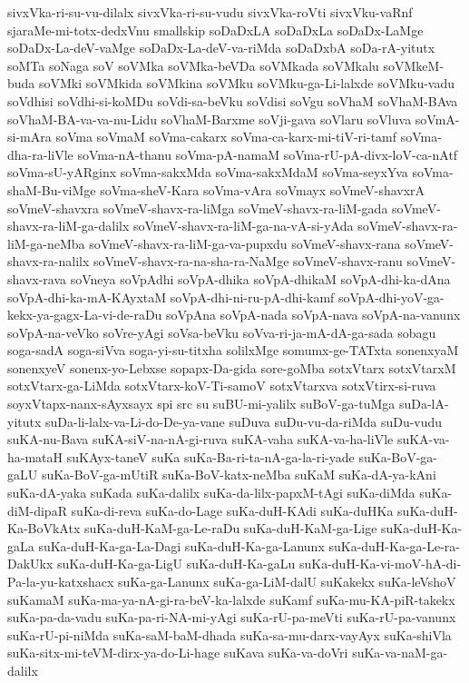 {sivxVka-ri-su-vu-dilalx
sivxVka-ri-su-vudu
sivxVka-roVti
sivxVku-vaRnf
sjaraMe-mi-totx-dedxVnu
smallskip
soDaDxLA
soDaDxLa
soDaDx-LaMge
soDaDx-La-deV-vaMge
soDaDx-La-deV-va-riMda
soDaDxbA
soDa-rA-yitutx
soMTa
soNaga
soV
soVMka
soVMka-beVDa
soVMkada
soVMkalu
soVMkeM-buda
soVMki
soVMkida
soVMkina
soVMku
soVMku-ga-Li-lalxde
soVMku-vadu
soVdhisi
soVdhi-si-koMDu
soVdi-sa-beVku
soVdisi
soVgu
soVhaM
soVhaM-BAva
soVhaM-BA-va-va-nu-Lidu
soVhaM-Barxme
soVji-gava
soVlaru
soVluva
soVmA-si-mAra
soVma
soVmaM
soVma-cakarx
soVma-ca-karx-mi-tiV-ri-tamf
soVma-dha-ra-liVle
soVma-nA-thanu
soVma-pA-namaM
soVma-rU-pA-divx-loV-ca-nAtf
soVma-sU-yARginx
soVma-sakxMda
soVma-sakxMdaM
soVma-seyxYva
soVma-shaM-Bu-viMge
soVma-sheV-Kara
soVma-vAra
soVmayx
soVmeV-shavxrA
soVmeV-shavxra
soVmeV-shavx-ra-liMga
soVmeV-shavx-ra-liM-gada
soVmeV-shavx-ra-liM-ga-dalilx
soVmeV-shavx-ra-liM-ga-na-vA-si-yAda
soVmeV-shavx-ra-liM-ga-neMba
soVmeV-shavx-ra-liM-ga-va-pupxdu
soVmeV-shavx-rana
soVmeV-shavx-ra-nalilx
soVmeV-shavx-ra-na-sha-ra-NaMge
soVmeV-shavx-ranu
soVmeV-shavx-rava
soVneya
soVpAdhi
soVpA-dhika
soVpA-dhikaM
soVpA-dhi-ka-dAna
soVpA-dhi-ka-mA-KAyxtaM
soVpA-dhi-ni-ru-pA-dhi-kamf
soVpA-dhi-yoV-ga-kekx-ya-gagx-La-vi-de-raDu
soVpAna
soVpA-nada
soVpA-nava
soVpA-na-vanunx
soVpA-na-veVko
soVre-yAgi
soVsa-beVku
soVva-ri-ja-mA-dA-ga-sada
sobagu
soga-sadA
soga-siVva
soga-yi-su-titxha
solilxMge
somumx-ge-TATxta
sonenxyaM
sonenxyeV
sonenx-yo-Lebxse
sopapx-Da-gida
sore-goMba
sotxVtarx
sotxVtarxM
sotxVtarx-ga-LiMda
sotxVtarx-koV-Ti-samoV
sotxVtarxva
sotxVtirx-si-ruva
soyxVtapx-nanx-sAyxsayx
spi
src
su
suBU-mi-yalilx
suBoV-ga-tuMga
suDa-lA-yitutx
suDa-li-lalx-va-Li-do-De-ya-vane
suDuva
suDu-vu-da-riMda
suDu-vudu
suKA-nu-Bava
suKA-siV-na-nA-gi-ruva
suKA-vaha
suKA-va-ha-liVle
suKA-va-ha-mataH
suKAyx-taneV
suKa
suKa-Ba-ri-ta-nA-ga-la-ri-yade
suKa-BoV-ga-gaLU
suKa-BoV-ga-mUtiR
suKa-BoV-katx-neMba
suKaM
suKa-dA-ya-kAni
suKa-dA-yaka
suKada
suKa-dalilx
suKa-da-lilx-papxM-tAgi
suKa-diMda
suKa-diM-dipaR
suKa-di-reva
suKa-do-Lage
suKa-duH-KAdi
suKa-duHKa
suKa-duH-Ka-BoVkAtx
suKa-duH-KaM-ga-Le-raDu
suKa-duH-KaM-ga-Lige
suKa-duH-Ka-gaLa
suKa-duH-Ka-ga-La-Dagi
suKa-duH-Ka-ga-Lanunx
suKa-duH-Ka-ga-Le-ra-DakUkx
suKa-duH-Ka-ga-LigU
suKa-duH-Ka-gaLu
suKa-duH-Ka-vi-moV-hA-di-Pa-la-yu-katxshacx
suKa-ga-Lanunx
suKa-ga-LiM-dalU
suKakekx
suKa-leVshoV
suKamaM
suKa-ma-ya-nA-gi-ra-beV-ka-lalxde
suKamf
suKa-mu-KA-piR-takekx
suKa-pa-da-vadu
suKa-pa-ri-NA-mi-yAgi
suKa-rU-pa-meVti
suKa-rU-pa-vanunx
suKa-rU-pi-niMda
suKa-saM-baM-dhada
suKa-sa-mu-darx-vayAyx
suKa-shiVla
suKa-sitx-mi-teVM-dirx-ya-do-Li-hage
suKava
suKa-va-doVri
suKa-va-naM-ga-dalilx
}
